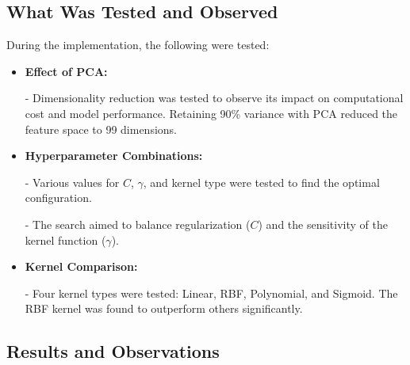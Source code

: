 \documentclass[lettersize,journal]{IEEEtran}
\begin{document}
\subsection{\textbf{What Was Tested and Observed}}
During the implementation, the following were tested:
\begin{itemize}
    \item \textbf{Effect of PCA:}
    
    - Dimensionality reduction was tested to observe its impact on computational cost and model performance. Retaining 90\% variance with PCA reduced the feature space to 99 dimensions.
    \item \textbf{Hyperparameter Combinations:}
    
    - Various values for $C$, $\gamma$, and kernel type were tested to find the optimal configuration.
    
    - The search aimed to balance regularization ($C$) and the sensitivity of the kernel function ($\gamma$).
    \item \textbf{Kernel Comparison:}
    
    - Four kernel types were tested: Linear, RBF, Polynomial, and Sigmoid. The RBF kernel was found to outperform others significantly.
\end{itemize}

\subsection{\textbf{Results and Observations}}
\end{document}
